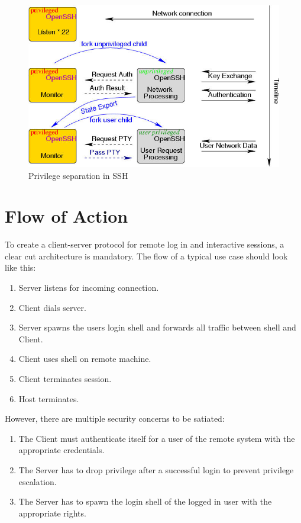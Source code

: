 \documentclass[10pt,a4paper,titlepage,twoside,english,final]{zhawreprt}
\begin{document}
\begin{figure}[ht]
\includegraphics[width=\textwidth]{priv}
\caption{Privilege separation in SSH \citep{ProvosSSHPriv}}
\label{fig:PrivilegeSeparationInSSH}
\end{figure}


\section{Flow of Action}\label{sec:DesignFlowOfAction}
To create a client-server protocol for remote log in and interactive sessions, a clear cut architecture is mandatory.
The flow of a typical use case should look like this:

\begin{enumerate}
\item Server listens for incoming connection.
\item Client dials server.
\item Server spawns the users login \gls{shell} and forwards all traffic between \gls{shell} and Client.
\item Client uses \gls{shell} on remote machine.
\item Client terminates session.
\item Host terminates.
\end{enumerate}

However, there are multiple security concerns to be satiated:

\begin{enumerate}
\item The Client must authenticate itself for a user of the remote system with the appropriate credentials.
\item The Server has to drop privilege after a successful login to prevent privilege escalation.
\item The Server has to spawn the login \gls{shell} of the logged in user with the appropriate rights.
\end{enumerate}
\end{document}
